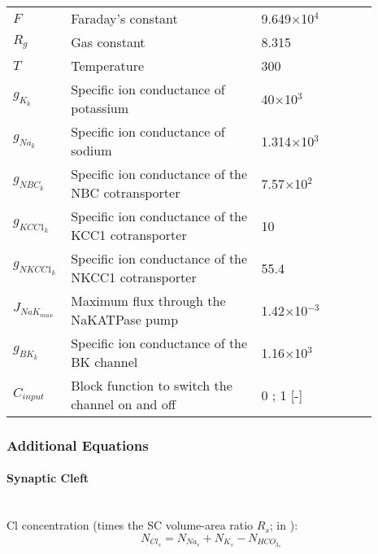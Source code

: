 \begin{table}[h!]
\centering
\begin{tabular}{ p{0.09\linewidth}  >{\footnotesize} p{0.5\linewidth}  >{\footnotesize} p{0.27\linewidth} >{\footnotesize} p{0.03\linewidth} }
\hline	
$F$ 			& Faraday's constant														& 9.649$\times$10$^4$ \Cmol 	& \\
$R_g$ 			& Gas constant 															& 8.315 \JmolK		& \\
$T$ 	    	& Temperature 															& 300 \Kelvin		& \\
$g_{K_{k}}$ 	& Specific ion conductance of potassium 								& 40$\times$10$^3$ \perOhmm 		& \cite{Ostby2009}  \\
$g_{Na_k}$ 		& Specific ion conductance of sodium 									& 1.314$\times$10$^3$  \perOhmm 	& \cite{Ostby2009}  \\
$g_{NBC_k}$ 	& Specific ion conductance of the NBC cotransporter						& 7.57$\times$10$^2$ \perOhmm 	& \cite{Ostby2009}  \\
$g_{KCC1_k}$ 	& Specific ion conductance of the KCC1 cotransporter					& 10 \perOhmm 	& \cite{Ostby2009}  \\
$g_{NKCC1_k}$ 	& Specific ion conductance of the NKCC1 cotransporter	 				& 55.4 \perOhmm 	& \cite{Ostby2009}  \\
$J_{NaK_{max}}$ & Maximum flux through the NaKATPase pump							& 1.42$\times$10$^{-3}$ \uMms 	& \cite{Ostby2009}  \\
$g_{BK_k}$ 		& Specific ion conductance of the BK channel							& 1.16$\times$10$^3$   \perOhmm & \cite{GonzalezFernandez1994}  \\
$C_{input}$  & Block function to switch the channel on and off &  0 ; 1 [-] 			&  \\
\hline
\end{tabular}
\end{table}

\subsubsection*{Additional Equations}
\paragraph{Synaptic Cleft}~\\
%
\gls{Cl} concentration  (times the SC volume-area ratio $R_s$; in \uMm): 
\begin{equation} \label{eq:ClEx}
N_{Cl_s}= N_{Na_s}+N_{K_s}-N_{ HCO_{3_s}}
\end{equation}


